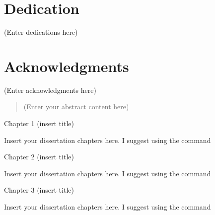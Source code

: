 \documentclass[oneside,11pt,letterpaper]{article}
\begin{document}
	\section*{Dedication}
		(Enter dedications here)
		\newpage
	
	\section*{Acknowledgments}
		(Enter acknowledgments here)
		\newpage
		
	
	\tableofcontents
		\newpage
	
	\listoftables
		\newpage
	
	\listoffigures
		\newpage
	
	
	\begin{abstract}
		
			(Enter your abstract content here)
	\end{abstract}
		\newpage
	
	\begin{center}
		\vspace*{\fill}
		\Large	Chapter 1 (insert title) 
		\vspace*{\fill}
	\end{center}
	\newpage
 	Insert your dissertation chapters here. I suggest using the \verb!! command
 	\newpage 
	 	
	\begin{center}
		\vspace*{\fill}
		\Large	Chapter 2 (insert title) 
		\vspace*{\fill}
	\end{center}
	\newpage
		Insert your dissertation chapters here. I suggest using the \verb!! command
	\newpage 
	
	\begin{center}
		\vspace*{\fill}
		\Large	Chapter 3 (insert title) 
		\vspace*{\fill}
	\end{center}
	\newpage
		Insert your dissertation chapters here. I suggest using the \verb!! command
\end{document}
